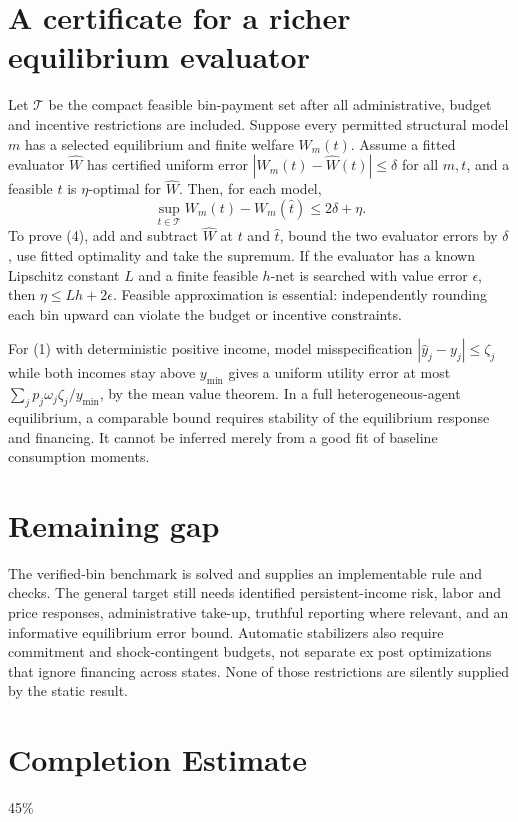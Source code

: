 \documentclass[11pt]{article}
\theoremstyle{definition}
\begin{document}
\section*{A certificate for a richer equilibrium evaluator}
Let $\mathcal T$ be the compact feasible bin-payment set after all administrative,
budget and incentive restrictions are included. Suppose every permitted
structural model $m$ has a selected equilibrium and finite welfare $W_m(t)$.
Assume a fitted evaluator $\widehat W$ has certified uniform error
$|W_m(t)-\widehat W(t)|\le\delta$ for all $m,t$, and a feasible $\widehat t$
is $\eta$-optimal for $\widehat W$. Then, for each model,
\[
 \sup_{t\in\mathcal T}W_m(t)-W_m(\widehat t)\le2\delta+\eta. \tag{4}
\]
To prove (4), add and subtract $\widehat W$ at $t$ and $\widehat t$, bound
the two evaluator errors by $\delta$, use fitted optimality and take the
supremum. If the evaluator has a known Lipschitz constant $L$ and a finite
feasible $h$-net is searched with value error $\epsilon$, then
$\eta\le Lh+2\epsilon$. Feasible approximation is essential: independently
rounding each bin upward can violate the budget or incentive constraints.

For (1) with deterministic positive income, model misspecification
$|\widehat y_j-y_j|\le\zeta_j$ while both incomes stay above $y_{\min}$
gives a uniform utility error at most
$\sum_jp_j\omega_j\zeta_j/y_{\min}$, by the mean value theorem. In a full
heterogeneous-agent equilibrium, a comparable bound requires stability of the
equilibrium response and financing. It cannot be inferred merely from a good
fit of baseline consumption moments.

\section*{Remaining gap}
The verified-bin benchmark is solved and supplies an implementable rule and
checks. The general target still needs identified persistent-income risk,
labor and price responses, administrative take-up, truthful reporting where
relevant, and an informative equilibrium error bound. Automatic stabilizers
also require commitment and shock-contingent budgets, not separate ex post
optimizations that ignore financing across states. None of those restrictions
are silently supplied by the static result.

\section{Completion Estimate}
45\%
\end{document}

